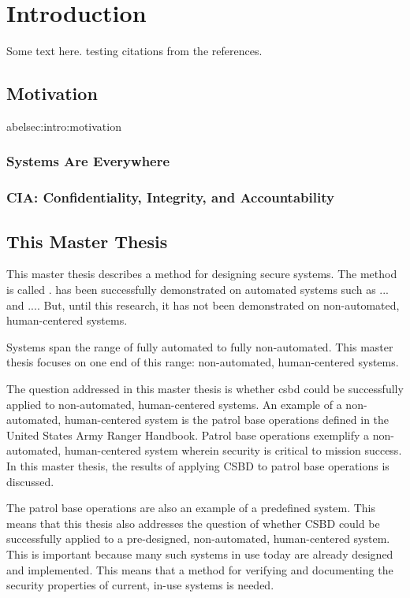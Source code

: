 \documentclass[../../main/main.tex]{subfiles}
\begin{document}
\glsresetall

\chapter{Introduction}
Some text here.\cite{ChinOlder} testing citations from the references.

\section{Motivation}\;abel{sec:intro:motivation}
\subsection{Systems Are Everywhere}
\subsection{CIA: Confidentiality, Integrity, and Accountability}


\section{This Master Thesis}\label{sec:thismasterthesis}
\glsresetall
This master thesis describes a method for designing secure systems.  The method is called .    has been successfully demonstrated on automated systems such as ... and ....  But, until this research, it has not been demonstrated on non-automated, human-centered systems.  

Systems span the range of fully automated to fully non-automated.  This master thesis focuses on one end of this range: non-automated, human-centered systems.




The question addressed in this master thesis is whether \gls{csbd} could be successfully applied to non-automated, human-centered systems.  An example of a non-automated, human-centered system is the patrol base operations defined in the United States Army Ranger Handbook\cite{rangermanual}.   Patrol base operations exemplify a non-automated, human-centered system wherein security is critical to mission success.  In this master thesis, the results of applying CSBD to patrol base operations is discussed. 


The patrol base operations are also an example of a predefined system.  This means that this thesis also addresses the question of whether CSBD could be successfully applied to a pre-designed, non-automated, human-centered system.  This is important because many such systems in use today are already designed and implemented.  This means that a method for verifying and documenting the security properties of current, in-use systems is needed.  
\end{document}
